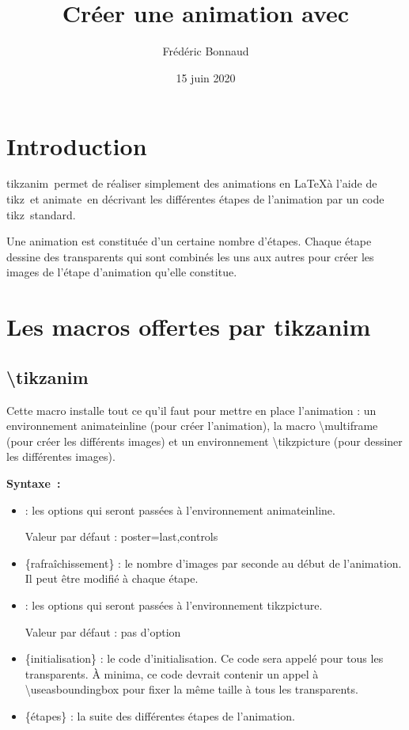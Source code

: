 \documentclass[a4paper,12pt]{article}
\author{Frédéric Bonnaud}%
\title{\TikzAnimate\\ Créer une animation avec \Tikz}
\date{15 juin 2020}
\newcommand\Tikz{{\ttfamily tikz}}
\newcommand\TikzAnimate{{\ttfamily tikzanim}}
\newcommand\Animate{{\ttfamily animate}}
\begin{document}
\maketitle

\tableofcontents

\section{Introduction}

\TikzAnimate\ permet de réaliser simplement des animations en \LaTeX à l'aide de \Tikz\ et \Animate\ en décrivant les différentes étapes de l'animation par un code \Tikz\ standard.

Une animation est constituée d'un certaine nombre d'étapes. Chaque étape dessine des transparents qui sont combinés les uns aux autres pour créer les images de l'étape d'animation qu'elle constitue.


\section{Les macros offertes par \TikzAnimate}

\subsection{\ttfamily\textbackslash tikzanim}

	Cette macro installe tout ce qu'il faut pour mettre en place l'animation : un environnement {\ttfamily animateinline} (pour créer l'animation), la macro {\ttfamily\textbackslash multiframe} (pour créer les différents images) et un environnement {\ttfamily\textbackslash tikzpicture} (pour dessiner les différentes images).
	
	\textbf{Syntaxe~:} 
	
	
	\begin{itemize}
		\item {} : les options qui seront passées à l'environnement {\ttfamily animateinline}.
		
		Valeur par défaut : {\ttfamily poster=last,controls}
		\item {\ttfamily \{rafraîchissement\}} : le nombre d'images par seconde au début de l'animation. Il peut être modifié à chaque étape.
		\item {} : les options qui seront passées à l'environnement {\ttfamily tikzpicture}.
		
		Valeur par défaut : pas d'option
		\item {\ttfamily \{initialisation\}} : le code d'initialisation. Ce code sera appelé pour tous les transparents. À minima, ce code devrait contenir un appel à {\ttfamily\textbackslash useasboundingbox} pour fixer la même taille à tous les transparents.
		\item {\ttfamily \{étapes\}} : la suite des différentes étapes de l'animation. 
	\end{itemize}
	
\end{document}
